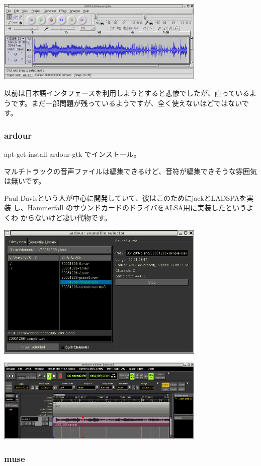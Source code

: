 \documentclass[mingoth,a4paper]{jsarticle}
\begin{document}
\includegraphics[width=10cm]{image200602/audacity.png}

以前は日本語インタフェースを利用しようとすると悲惨でしたが、直っているよ
うです。まだ一部問題が残っているようですが、全く使えないほどではないです。

\subsubsection{ardour}

apt-get install ardour-gtk でインストール。

マルチトラックの音声ファイルは編集できるけど、音符が編集できそうな雰囲気
は無いです。

Paul Davisという人が中心に開発していて、彼はこのためにjackとLADSPAを実装
し、Hammerfall のサウンドカードのドライバをALSA用に実装したというよくわ
からないけど凄い代物です。

\includegraphics[width=10cm]{image200602/ardour1.png}

\includegraphics[width=10cm]{image200602/ardour2.png}

\subsubsection{muse}
\end{document}
